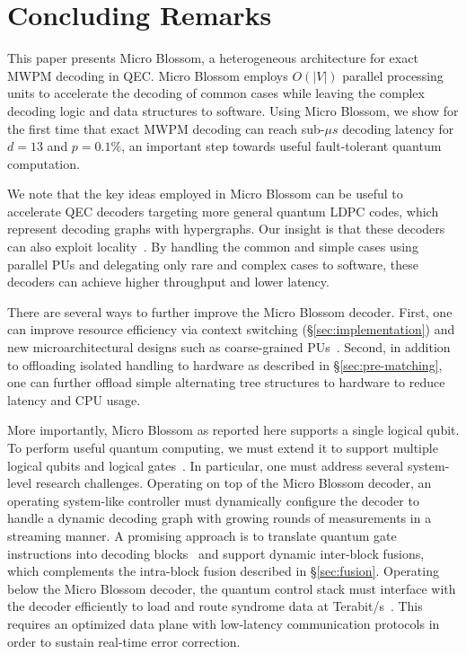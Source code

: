 \section{Concluding Remarks}\label{sec:conclusion}

This paper presents Micro Blossom, a heterogeneous architecture for exact MWPM decoding in QEC. Micro Blossom employs $O(|V|)$ parallel processing units to accelerate the decoding of common cases while leaving the complex decoding logic and data structures to software.
Using Micro Blossom, we show for the first time that exact MWPM decoding can reach sub-$\mu s$ decoding latency for $d = 13$ and $p = 0.1\%$, an important step towards useful fault-tolerant quantum computation.

We note that the key ideas employed in Micro Blossom can be useful to accelerate QEC decoders targeting more general quantum LDPC codes, which represent decoding graphs with hypergraphs.
Our insight is that these decoders can also exploit locality~\cite{delfosse2022toward,hillmann2024localized,wu2024hypergraph}.
By handling the common and simple cases using parallel PUs and delegating only rare and complex cases to software, these decoders can achieve higher throughput and lower latency.

There are several ways to further improve the Micro Blossom decoder. First, one can improve resource efficiency via context switching (\S\ref{sec:implementation}) and new microarchitectural designs such as coarse-grained PUs~\cite{ziad2024local}.
Second, in addition to offloading isolated \conf handling to hardware as described in \S\ref{sec:pre-matching}, one can further offload simple alternating tree structures to hardware to reduce latency and CPU usage.

More importantly, Micro Blossom as reported here supports a single logical qubit.
To perform useful quantum computing, we must extend it to support multiple logical qubits and logical gates~\cite{beverland2022assessing}.
In particular, one must address several system-level research challenges.
Operating on top of the Micro Blossom decoder, an operating system-like controller must dynamically configure the decoder to handle a dynamic decoding graph with growing rounds of measurements  in a streaming manner.
A promising approach is to translate quantum gate instructions into decoding blocks~\cite{wu2024lego} and support dynamic inter-block fusions, which complements the intra-block fusion described in \S\ref{sec:fusion}.
Operating below the Micro Blossom decoder, the quantum control stack must interface with the decoder efficiently to load and route syndrome data at Terabit/s~\cite{delfosse2020hierarchical}.
This requires an optimized data plane with low-latency communication protocols in order to sustain real-time error correction.
